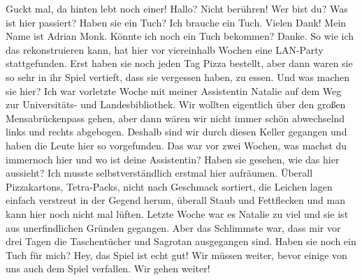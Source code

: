 \begin{verseplay}[7em]
\s{\Legolars}  Guckt mal, da hinten lebt noch einer!
\s{\Gandalf}  Hallo?
\s{\Monk}  Nicht berühren! 
\s{\Gandalf} Wer bist du? Was ist hier passiert?
\s{\Monk} Haben sie ein Tuch? Ich brauche ein Tuch.
\s{\Gandalf} 
\s{\Legolars} 
\s{\Monk} Vielen Dank! 
\s{\Monk} Mein Name ist Adrian Monk. Könnte ich noch ein Tuch bekommen?
\s{\Legolars} 
\s{\Monk}  Danke. So wie ich das rekonstruieren kann, hat hier vor viereinhalb Wochen eine LAN-Party stattgefunden. Erst haben sie noch jeden Tag Pizza bestellt, aber dann waren sie so sehr in ihr Spiel vertieft, dass sie vergessen haben, zu essen.
\s{\Gimli} 
\s{\Legolars} Und was machen sie hier?
\s{\Monk} Ich war vorletzte Woche mit meiner Assistentin Natalie auf dem Weg zur Universitäts- und Landesbibliothek. Wir wollten eigentlich über den großen Mensabrückenpass gehen, aber dann wären wir nicht immer schön abwechselnd links und rechts abgebogen. Deshalb sind wir durch diesen Keller gegangen und haben die Leute hier so vorgefunden.
\s{\Gandalf} Das war vor zwei Wochen, was machst du immernoch hier und wo ist deine Assistentin?
\s{\Monk} Haben sie gesehen, wie das hier aussieht? Ich musste selbstverständlich erstmal hier aufräumen. Überall Pizzakartons, Tetra-Packs, nicht nach Geschmack sortiert, die Leichen lagen einfach verstreut in der Gegend herum, überall Staub und Fettflecken und man kann hier noch nicht mal lüften. Letzte Woche war es Natalie zu viel und sie ist aus unerfindlichen Gründen gegangen. Aber das Schlimmste war, dass mir vor drei Tagen die Taschentücher und Sagrotan ausgegangen sind.  Haben sie noch ein Tuch für mich?
\s{\Legolars} 
\s{\Monk} 
\s{\Sum} Hey, das Spiel ist echt gut!
\s{\Gandalf}  Wir müssen weiter, bevor einige von uns  auch dem Spiel verfallen.
\s{\Gimli} 
\s{\Gandalf}  Wir gehen weiter!
\s{\Sum} 
\end{verseplay}

